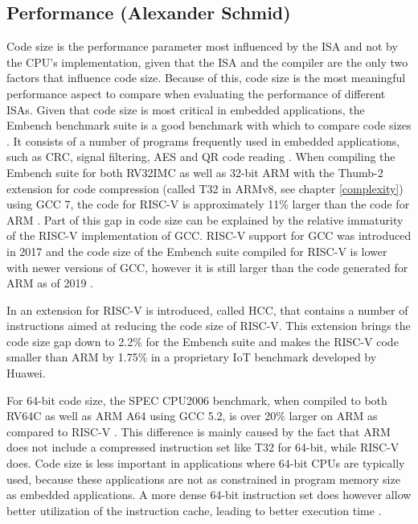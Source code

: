 \documentclass[conference]{IEEEtran}
\begin{document}
	\subsection{Performance (Alexander Schmid)}
	\label{performance}
	Code size is the performance parameter most influenced by the \gls{ISA} and not by the \gls{CPU}'s implementation,
	given that the \gls{ISA} and the compiler are the only two factors that influence code size.
	Because of this, code size is the most meaningful performance aspect to compare when evaluating the performance of different \glspl{ISA}.
	Given that code size is most critical in embedded applications, the Embench benchmark suite is a good benchmark
	with which to compare code sizes \cite{Patterson2019}. It consists of a number of programs frequently used in embedded
	applications, such as CRC, signal filtering, AES and QR code reading \cite{Patterson2019}.
	When compiling the Embench suite for both RV32IMC as well as 32-bit ARM with the Thumb-2 extension for code compression (called T32 in ARMv8, see chapter \ref{complexity}) using GCC 7,
	the code for RISC-V is approximately 11\% larger than the code for ARM \cite{Perotti2020}.
	Part of this gap in code size can be explained by the relative immaturity of the RISC-V implementation of
	GCC. RISC-V support for GCC was introduced in 2017 and the code size of the Embench suite
	compiled for RISC-V is lower with newer versions of GCC, however it is still larger than the code generated for ARM as of 2019 \cite{Patterson2019}.

	In \cite{Perotti2020} an extension for RISC-V is introduced, called HCC, that contains a number of instructions
	aimed at reducing the code size of RISC-V. This extension brings the code size gap down to 2.2\% for the Embench suite
	and makes the RISC-V code smaller than ARM by 1.75\% in a proprietary IoT benchmark developed by Huawei. \cite{Perotti2020}
	
	For 64-bit code size, the SPEC CPU2006 benchmark, when compiled to both RV64C as well as ARM A64 using GCC 5.2,
	is over 20\% larger on ARM as compared to RISC-V \cite[page 62]{Waterman2016}.
	This difference is mainly caused by the fact that ARM does not include a compressed instruction set like T32 for 64-bit, while RISC-V does.
	Code size is less important in applications where 64-bit \glspl{CPU} are typically used, because these applications
	are not as constrained in program memory size as embedded applications. A more dense 64-bit instruction set does however allow better utilization of the instruction cache,
	leading to better execution time \cite[slide 46]{Celio2016}.
\end{document}
